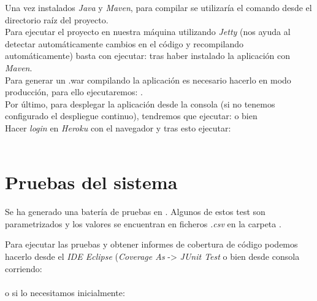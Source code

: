 Una vez instalados \textit{Java} y \textit{Maven}, para compilar se utilizaría el comando  desde el directorio raíz del proyecto.\\

Para ejecutar el proyecto en nuestra máquina utilizando \textit{Jetty} (nos ayuda al detectar automáticamente cambios en el código y recompilando automáticamente) basta con ejecutar:  tras haber instalado la aplicación con \textit{Maven}.\\

Para generar un .war compilando la aplicación es necesario hacerlo en modo producción, para ello ejecutaremos: .\\

Por último, para desplegar la aplicación desde la consola (si no tenemos configurado el despliegue continuo), tendremos que ejecutar:
 o bien \\
Hacer \textit{login} en \textit{Heroku} con el navegador y tras esto ejecutar:\\
\\

\newpage
\section{Pruebas del sistema}
Se ha generado una batería de pruebas en . Algunos de estos test son parametrizados y los valores se encuentran en ficheros \textit{.csv} en la carpeta .

Para ejecutar las pruebas y obtener informes de cobertura de código podemos hacerlo desde el \textit{IDE Eclipse} (\textit{Coverage As} -> \textit{JUnit Test} o bien desde consola corriendo:\\
\\
o si lo necesitamos inicialmente:\\
